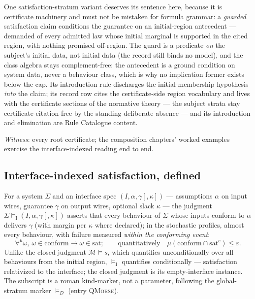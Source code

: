 One satisfaction-stratum variant deserves its sentence here,
because it is certificate machinery and must not be mistaken for
formula grammar: a \emph{guarded} satisfaction claim conditions the
guarantee on an initial-region antecedent --- demanded of every
admitted law whose initial marginal is supported in the cited
region, with nothing promised off-region. The guard is a predicate
\emph{on} the subject's initial data, not initial data (the record
still binds no model), and the class algebra stays
complement-free: the antecedent is a ground condition on system
data, never a behaviour class, which is why no implication former
exists below the cap. Its introduction rule discharges the
initial-membership hypothesis \emph{into} the claim; its record row
cites the certificate-side region vocabulary and lives with the
certificate sections of the normative theory --- the subject strata
stay certificate-citation-free by the standing deliberate absence
--- and its introduction and elimination are Rule Catalogue
content.

\emph{Witness}: every root certificate; the composition chapters'
worked examples exercise the interface-indexed reading end to end.



\subsection{Interface-indexed satisfaction, defined}
\label{sec:spec-lang-vdashi}


For a system $\Sigma$ and an interface spec
$(I, \alpha, \gamma[, \kappa])$ --- assumptions $\alpha$ on input
wires, guarantee $\gamma$ on output wires, optional slack $\kappa$
--- the judgment $\Sigma \vDash_{\mathrm{I}} (I, \alpha, \gamma[,
\kappa])$ asserts that every behaviour of $\Sigma$ whose inputs
conform to $\alpha$ delivers $\gamma$ (with margin per $\kappa$ where
declared); in the stochastic profiles, almost every behaviour, with
failure measured \emph{within the conforming event}:
\[
\forall^{\mu}\omega,\ \omega \in \mathrm{conform} \to \omega \in
\mathrm{sat};
\qquad\text{quantitatively}\quad
\mu(\mathrm{conform} \cap \mathrm{sat}^{c}) \le \varepsilon .
\]
Unlike the closed judgment $\mathcal{M} \vDash s$, which quantifies
unconditionally over all behaviours from the initial region,
$\vDash_{\mathrm{I}}$ quantifies conditionally --- satisfaction
relativized to the interface; the closed judgment is its
empty-interface instance. The subscript is a roman kind-marker, not a
parameter, following the global-stratum marker $\vDash_D$ (entry
\textsc{QMorse}).

